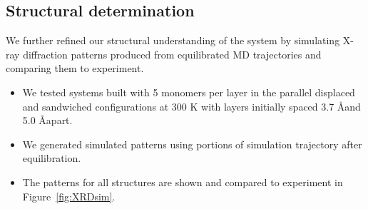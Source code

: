 \documentclass{article}
\begin{document}
  \subsection{Structural determination}
  
  We further refined our structural understanding of the system by simulating X-ray 
  diffraction patterns produced from equilibrated MD trajectories and comparing them
  to experiment. 
  \begin{itemize}
	  	\item We tested systems built with 5 monomers per layer in the parallel 
		displaced and sandwiched configurations at 300 K with layers initially spaced
		3.7 \AA and 5.0 \AA apart.
		\item We generated simulated patterns using portions of simulation trajectory
		after equilibration.
		\item The patterns for all structures are shown and compared to experiment
		in Figure~\ref{fig:XRDsim}.
  \end{itemize}


  
\end{document}
